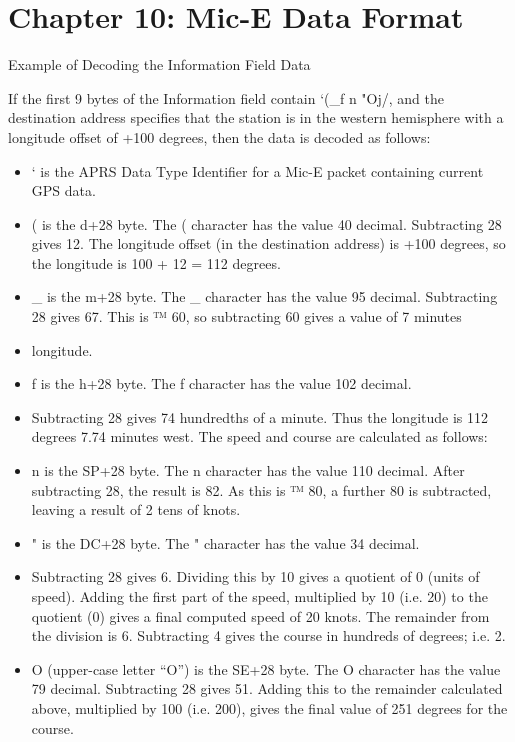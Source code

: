 \chapter{Chapter 10: Mic-E Data Format}

Example of
Decoding the
Information Field
Data

If the first 9 bytes of the Information field contain ‘(_f n "Oj/, and the
destination address specifies that the station is in the western hemisphere
with a longitude offset of +100 degrees, then the data is decoded as follows:

\begin{itemize}
\item  ‘ is the APRS Data Type Identifier for a Mic-E packet containing current GPS data.
\item ( is the d+28 byte. The ( character has the value 40 decimal. Subtracting
28 gives 12. The longitude offset (in the destination address) is +100
degrees, so the longitude is 100 + 12 = 112 degrees.

\item _ is the m+28 byte. The _ character has the value 95 decimal. Subtracting
28 gives 67. This is ™ 60, so subtracting 60 gives a value of 7 minutes

\item longitude.

\item f is the h+28 byte. The f character has the value 102 decimal.

\item Subtracting 28 gives 74 hundredths of a minute.
Thus the longitude is 112 degrees 7.74 minutes west.
The speed and course are calculated as follows:

\item n is the SP+28 byte. The n character has the value 110 decimal. After
subtracting 28, the result is 82. As this is ™ 80, a further 80 is subtracted,
leaving a result of 2 tens of knots.

\item " is the DC+28 byte. The " character has the value 34 decimal.

\item Subtracting 28 gives 6. Dividing this by 10 gives a quotient of 0 (units of
speed). Adding the first part of the speed, multiplied by 10 (i.e. 20) to the
quotient (0) gives a final computed speed of 20 knots.
The remainder from the division is 6. Subtracting 4 gives the course in
hundreds of degrees; i.e. 2.

\item O (upper-case letter “O”) is the SE+28 byte. The O character has the value
79 decimal. Subtracting 28 gives 51. Adding this to the remainder
calculated above, multiplied by 100 (i.e. 200), gives the final value of
251 degrees for the course.

\end {itemize}

